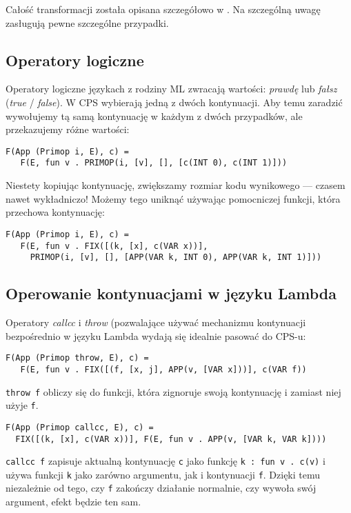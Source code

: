 \documentclass[11pt]{scrartcl}
\begin{document}
Całość transformacji została opisana szczegółowo w \cite{Appel5}. Na szczególną uwagę
zasługują pewne szczególne przypadki.

\subsection{Operatory logiczne}
Operatory logiczne językach z rodziny ML zwracają wartości: \textit{prawdę} lub \textit{fałsz}
(\textit{true} / \textit{false}). W CPS wybierają jedną z dwóch kontynuacji. Aby temu zaradzić
wywołujemy tą samą kontynuację w każdym z dwóch przypadków, ale przekazujemy
różne wartości:
\begin{lstlisting}
F(App (Primop i, E), c) =
   F(E, fun v . PRIMOP(i, [v], [], [c(INT 0), c(INT 1)]))
\end{lstlisting}

Niestety kopiując kontynuację, zwiększamy rozmiar kodu wynikowego --- czasem nawet
wykładniczo! Możemy tego uniknąć używając pomocniczej funkcji, która przechowa
kontynuację:
\begin{lstlisting}
F(App (Primop i, E), c) =
   F(E, fun v . FIX([(k, [x], c(VAR x))],
     PRIMOP(i, [v], [], [APP(VAR k, INT 0), APP(VAR k, INT 1)]))
\end{lstlisting}

\subsection{Operowanie kontynuacjami w języku Lambda}
Operatory \textit{callcc} i \textit{throw} (pozwalające używać mechanizmu kontynuacji bezpośrednio
w języku Lambda wydają się idealnie pasować do CPS-u:
\begin{lstlisting}
F(App (Primop throw, E), c) =
   F(E, fun v . FIX([(f, [x, j], APP(v, [VAR x]))], c(VAR f))
\end{lstlisting}
\lstinline|throw f| obliczy się do funkcji, która zignoruje swoją kontynuację i zamiast niej
użyje \lstinline|f|.

\begin{lstlisting}
F(App (Primop callcc, E), c) =
  FIX([(k, [x], c(VAR x))], F(E, fun v . APP(v, [VAR k, VAR k])))
\end{lstlisting}
\lstinline|callcc f| zapisuje aktualną kontynuację \lstinline|c| jako funkcję \lstinline|k : fun v . c(v)| i używa
funkcji \lstinline|k| jako zarówno argumentu, jak i kontynuacji \lstinline|f|. Dzięki temu niezależnie
od tego, czy \lstinline|f| zakończy działanie normalnie, czy wywoła swój argument, efekt
będzie ten sam.
\end{document}
